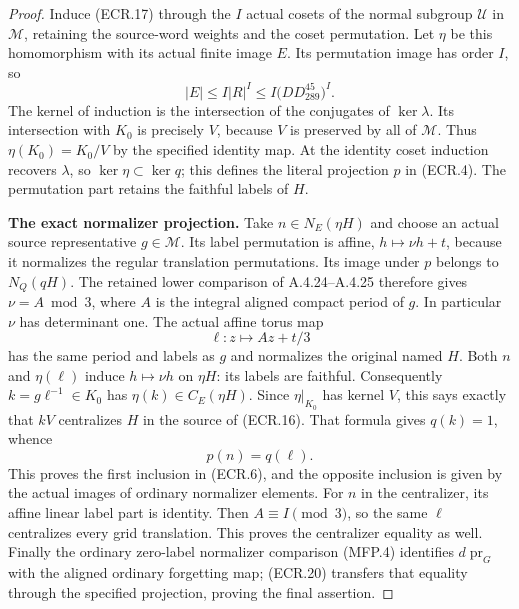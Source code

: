 \begin{proof}
Induce (ECR.17) through the $I$ actual cosets of the normal subgroup
$\mathcal U$ in $\mathcal M$, retaining the source-word weights and
the coset permutation.  Let $\eta$ be this homomorphism with its
actual finite image $E$.  Its permutation image has order $I$, so
\[
 |E|\leq I|R|^I\leq I\bigl(D D_{289}^{45}\bigr)^I.
                                                               \tag{ECR.18}
\]
The kernel of induction is the intersection of the conjugates of
$\ker\lambda$.  Its intersection with $K_0$ is precisely $V$,
because $V$ is preserved by all of $\mathcal M$.  Thus
$\eta(K_0)=K_0/V$ by the specified identity map.  At the identity
coset induction recovers $\lambda$, so $\ker\eta\subset\ker q$;
this defines the literal projection $p$ in (ECR.4).
The permutation part retains the faithful labels of $H$.

\par\medskip\noindent\textbf{The exact normalizer projection.}\quad
Take $n\in N_E(\eta H)$ and choose an actual source representative
$g\in\mathcal M$.  Its label permutation is affine,
$h\mapsto\nu h+t$, because it normalizes the regular translation
permutations.  Its image under $p$ belongs to $N_Q(qH)$.
The retained lower comparison of A.4.24--A.4.25 therefore gives
$\nu=A\bmod3$, where $A$ is the integral aligned compact period
of $g$.  In particular $\nu$ has determinant one.
The actual affine torus map
\[
                  \ell:z\longmapsto Az+t/3
                                                               \tag{ECR.19}
\]
has the same period and labels as $g$ and normalizes the original
named $H$.  Both $n$ and $\eta(\ell)$ induce $h\mapsto\nu h$ on
$\eta H$: its labels are faithful.  Consequently
$k=g\ell^{-1}\in K_0$ has $\eta(k)\in C_E(\eta H)$.
Since $\eta|_{K_0}$ has kernel $V$, this says exactly that $kV$
centralizes $H$ in the source of (ECR.16).  That formula gives
$q(k)=1$, whence
\[
                         p(n)=q(\ell).
                                                               \tag{ECR.20}
\]
This proves the first inclusion in (ECR.6), and the opposite inclusion
is given by the actual images of ordinary normalizer elements.
For $n$ in the centralizer, its affine linear label part is identity.
Then $A\equiv I\pmod3$, so the same $\ell$ centralizes every grid
translation.  This proves the centralizer equality as well.
Finally the ordinary zero-label normalizer comparison (MFP.4)
identifies $d\operatorname{pr}_G$ with the aligned ordinary
forgetting map; (ECR.20) transfers that equality through the specified
projection, proving the final assertion.
\end{proof}

